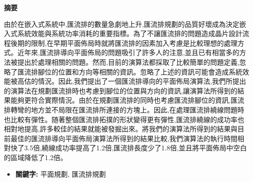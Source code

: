 



\newpage
{}
{}


\begin{center}
\large \textbf{摘要}
\end{center}


由於在嵌入式系統中,匯流排的數量急劇地上升,匯流排規劃的品質好壞成為決定嵌入式系統效能與系統功率消耗的重要指標。為了不讓匯流排的問題造成晶片設計流程後期的限制,在早期平面佈局時就將匯流排的因素加入考慮是比較理想的處理方式。近年來,匯流排導向平面佈局的問題吸引了許多人的注意,並且已有相當多的方法被提出於處理相關的問題。然而,目前的演算法都採取了比較簡單的問題定義,忽略了匯流排腳位的位置和方向等相關的資訊。忽略了上述的資訊可能會造成系統效能被高估的情況。因此,我們提出了一個匯流排導向的平面佈局演算法,我們所提出的演算法在規劃匯流排時也考慮到腳位的位置與方向的資訊,讓演算法所得到的結果能夠更符合實際情況。由於在規劃匯流排的同時也考慮匯流排腳位的資訊,匯流排轉彎的地方並不局限在匯流排所連接的方塊上。因此,在處理匯流排繞線問題時也比較有彈性。随著整個匯流排拓撲的形狀變得更有彈性,匯流排繞線的成功率也相對地提高,許多較佳的結果就能被發掘出來。將我們的演算法所得到的結果與目前最佳的匯流排導向平面佈局演算法所得到的結果比較,我們演算法的執行時間相對快了3.5倍,繞線成功率提高了1.2倍,匯流排長度少了1.8倍,並且將平面佈局中空白的區域降低了1.2倍。


\begin{itemize}
\item {\bf 關鍵字:} 平面規劃, 匯流排規劃
\end{itemize}



